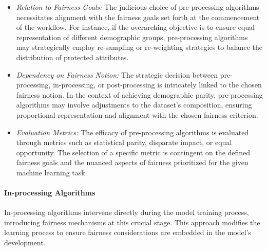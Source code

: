 \begin{itemize}

    \item \emph{Relation to Fairness Goals:} The judicious choice of pre-processing algorithms necessitates alignment with the fairness goals set forth at the commencement of the workflow. For instance, if the overarching objective is to ensure equal representation of different demographic groups, pre-processing algorithms may strategically employ re-sampling or re-weighting strategies to balance the distribution of protected attributes.

    \item \emph{Dependency on Fairness Notion:} The strategic decision between pre-processing, in-processing, or post-processing is intricately linked to the chosen fairness notion. In the context of achieving demographic parity, pre-processing algorithms may involve adjustments to the dataset's composition, ensuring proportional representation and alignment with the chosen fairness criterion.

    \item \emph{Evaluation Metrics:} The efficacy of pre-processing algorithms is evaluated through metrics such as statistical parity, disparate impact, or equal opportunity. The selection of a specific metric is contingent on the defined fairness goals and the nuanced aspects of fairness prioritized for the given machine learning task.

\end{itemize}

\paragraph{In-processing Algorithms}

In-processing algorithms intervene directly during the model training process, introducing fairness mechanisms at this crucial stage. This approach modifies the learning process to ensure fairness considerations are embedded in the model's development.

